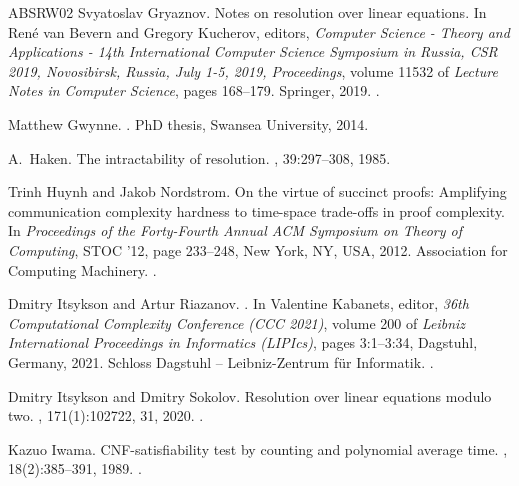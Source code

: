 \documentclass[11pt]{article}
\numberwithin{equation}{section}
\begin{document}
\begin{thebibliography}{ABSRW02}
Svyatoslav Gryaznov.
\newblock Notes on resolution over linear equations.
\newblock In Ren{\'{e}} van Bevern and Gregory Kucherov, editors, {\em Computer
  Science - Theory and Applications - 14th International Computer Science
  Symposium in Russia, {CSR} 2019, Novosibirsk, Russia, July 1-5, 2019,
  Proceedings}, volume 11532 of {\em Lecture Notes in Computer Science}, pages
  168--179. Springer, 2019.
\newblock \href {https://doi.org/10.1007/978-3-030-19955-5\_15}
  {}.

Matthew Gwynne.
.
\newblock PhD thesis, Swansea University, 2014.

A.~Haken.
\newblock The intractability of resolution.
, 39:297--308, 1985.

Trinh Huynh and Jakob Nordstrom.
\newblock On the virtue of succinct proofs: Amplifying communication complexity
  hardness to time-space trade-offs in proof complexity.
\newblock In {\em Proceedings of the Forty-Fourth Annual ACM Symposium on
  Theory of Computing}, STOC '12, page 233–248, New York, NY, USA, 2012.
  Association for Computing Machinery.
\newblock \href {https://doi.org/10.1145/2213977.2214000}
  {}.

Dmitry Itsykson and Artur Riazanov.
.
\newblock In Valentine Kabanets, editor, {\em 36th Computational Complexity
  Conference (CCC 2021)}, volume 200 of {\em Leibniz International Proceedings
  in Informatics (LIPIcs)}, pages 3:1--3:34, Dagstuhl, Germany, 2021. Schloss
  Dagstuhl -- Leibniz-Zentrum f{\"u}r Informatik.
\newblock \href {https://doi.org/10.4230/LIPIcs.CCC.2021.3}
  {}.

Dmitry Itsykson and Dmitry Sokolov.
\newblock Resolution over linear equations modulo two.
, 171(1):102722, 31, 2020.
\newblock \href {https://doi.org/10.1016/j.apal.2019.102722}
  {}.

Kazuo Iwama.
\newblock C{NF}-satisfiability test by counting and polynomial average time.
, 18(2):385--391, 1989.
\newblock \href {https://doi.org/10.1137/0218026} {}.


\end{thebibliography}
\end{document}
